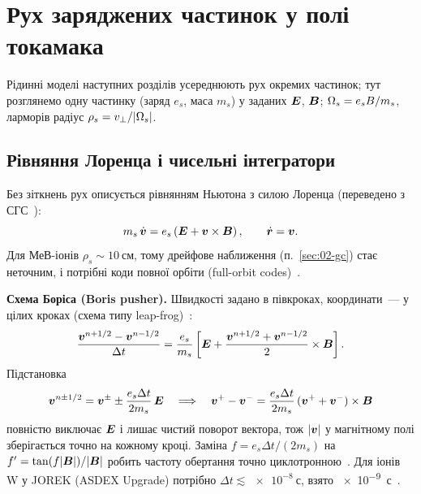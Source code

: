\chapter{Рух заряджених частинок у полі токамака}\label{ch:particles}

Рідинні моделі наступних розділів усереднюють рух окремих частинок; тут розглянемо одну частинку (заряд $e_s$, маса $m_s$) у заданих $\bm{E}$, $\bm{B}$; $\Omega_{s}=e_sB/m_s$, ларморів радіус $\rho_s=v_\perp/|\Omega_{s}|$.

\section{Рівняння Лоренца і чисельні інтегратори}\label{sec:02-lorentz}

Без зіткнень рух описується рівнянням Ньютона з силою Лоренца (переведено з СГС~\cite{Moskvitina2010}):
\begin{equation}\label{eq:02-lorentz}
  m_s\,\dot{\bm{v}} = e_s\left(\bm{E}+\bm{v}\times\bm{B}\right),\qquad \dot{\bm{r}}=\bm{v}.
\end{equation}
Для МеВ-іонів $\rho_s\sim\SI{10}{см}$, тому дрейфове наближення (п.~\ref{sec:02-gc}) стає неточним, і потрібні коди повної орбіти (full-orbit codes)~\cite{Moskvitina2010}.

\textbf{Схема Боріса (Boris pusher).} Швидкості задано в півкроках, координати~--- у цілих кроках (схема типу leap-frog)~\cite{vanVugt2019}:
\begin{equation}\label{eq:02-boris}
  \frac{\bm{v}^{n+1/2}-\bm{v}^{n-1/2}}{\Delta t}=\frac{e_s}{m_s}\left[\bm{E}+\frac{\bm{v}^{n+1/2}+\bm{v}^{n-1/2}}{2}\times\bm{B}\right].
\end{equation}
Підстановка
\[
  \bm{v}^{n\pm1/2}=\bm{v}^{\pm}\pm\frac{e_s\Delta t}{2m_s}\,\bm{E}
  \quad\Longrightarrow\quad
  \bm{v}^{+}-\bm{v}^{-}=\frac{e_s\Delta t}{2m_s}\,(\bm{v}^{+}+\bm{v}^{-})\times\bm{B}
\]
повністю виключає $\bm{E}$ і лишає чистий поворот вектора, тож $|\bm{v}|$ у магнітному полі зберігається точно на кожному кроці. Заміна $f=e_s\Delta t/(2m_s)$ на $f'=\tan(f|\bm{B}|)/|\bm{B}|$ робить частоту обертання точно циклотронною~\cite{vanVugt2019}. Для іонів W у JOREK (ASDEX Upgrade) потрібно $\Delta t\lesssim\SI{e-8}{с}$, взято \SI{e-9}{с}~\cite{vanVugt2019}.

